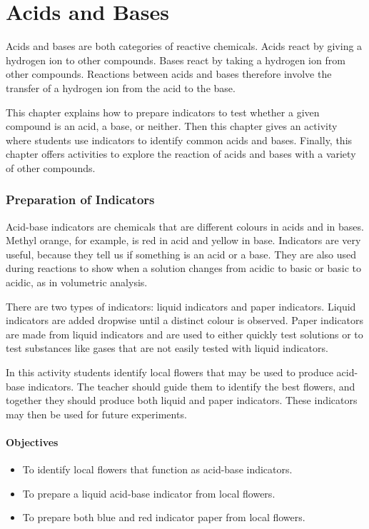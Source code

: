 \chapter{Acids and Bases}

Acids and bases are both categories of reactive chemicals. Acids react by giving a hydrogen ion to other compounds. Bases react by taking a hydrogen ion from other compounds. Reactions between acids and bases therefore involve the transfer of a hydrogen ion from the acid to the base.

This chapter explains how to prepare indicators to test whether a given compound is an acid, a base, or neither. Then this chapter gives an activity where students use indicators to identify common acids and bases. Finally, this chapter offers activities to explore the reaction of acids and bases with a variety of other compounds.

\subsection{Preparation of Indicators}

Acid-base indicators are chemicals that are different colours in acids and in bases. Methyl orange, for example, is red in acid and yellow in base. Indicators are very useful, because they tell us if something is an acid or a base. They are also used during reactions to show when a solution changes from acidic to basic or basic to acidic, as in volumetric analysis.

There are two types of indicators: liquid indicators and paper indicators. Liquid indicators are added dropwise until a distinct colour is observed. Paper indicators are made from liquid indicators and are used to either quickly test solutions or to test substances like gases that are not easily tested with liquid indicators.

In this activity students identify local flowers that may be used to produce acid-base indicators. The teacher should guide them to identify the best flowers, and together they should produce both liquid and paper indicators. These indicators may then be used for future experiments.

\subsubsection*{Objectives}
\begin{itemize}
\item{To identify local flowers that function as acid-base indicators.}
\item{To prepare a liquid acid-base indicator from local flowers.}
\item{To prepare both blue and red indicator paper from local flowers.}
\end{itemize}

